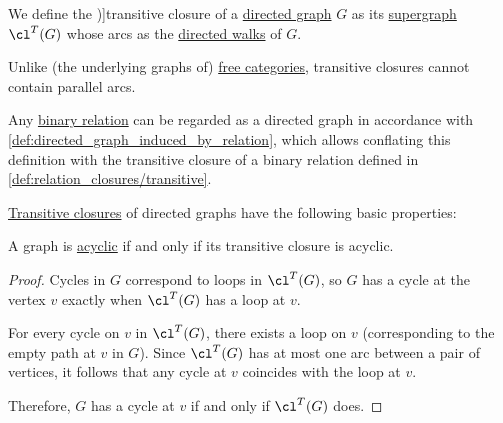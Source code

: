 \begin{definition}\label{def:directed_graph_transitive_closure}
  We define the \term[ru=транзитивное замыкание (\cite[exerc. 4.5.1]{Зыков2004ТеорияГрафов})]{transitive closure} of a \hyperref[def:directed_graph]{directed graph} \( G \) as its \hyperref[def:directed_graph/submodel]{supergraph} \( \cl^T(G) \) whose arcs as the \hyperref[def:graph_walk/directed]{directed walks} of \( G \).
\end{definition}
\begin{comments}
  \item Unlike (the underlying graphs of) \hyperref[def:free_category]{free categories}, transitive closures cannot contain parallel arcs.

  \item Any \hyperref[def:binary_relation]{binary relation} can be regarded as a directed graph in accordance with \cref{def:directed_graph_induced_by_relation}, which allows conflating this definition with the transitive closure of a binary relation defined in \cref{def:relation_closures/transitive}.
\end{comments}

\begin{proposition}\label{thm:def:directed_graph_transitive_closure}
  \hyperref[def:directed_graph_transitive_closure]{Transitive closures} of directed graphs have the following basic properties:
  \begin{thmenum}
     A graph is \hyperref[def:acyclic_graph]{acyclic} if and only if its transitive closure is acyclic.
  \end{thmenum}
\end{proposition}
\begin{proof}
   Cycles in \( G \) correspond to loops in \( \cl^T(G) \), so \( G \) has a cycle at the vertex \( v \) exactly when \( \cl^T(G) \) has a loop at \( v \).

  For every cycle on \( v \) in \( \cl^T(G) \), there exists a loop on \( v \) (corresponding to the empty path at \( v \) in \( G \)). Since \( \cl^T(G) \) has at most one arc between a pair of vertices, it follows that any cycle at \( v \) coincides with the loop at \( v \).

  Therefore, \( G \) has a cycle at \( v \) if and only if \( \cl^T(G) \) does.
\end{proof}

